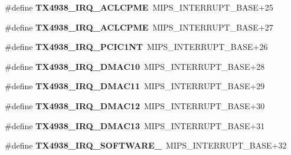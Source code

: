 \begin{DoxyCompactItemize}
\item 
\mbox{\label{group__bsp__interrupt_ga5f49d9074d04efb12e01379a526aa18e}} 
\#define {\bfseries T\+X4938\+\_\+\+I\+R\+Q\+\_\+\+A\+C\+L\+C\+P\+ME}~M\+I\+P\+S\+\_\+\+I\+N\+T\+E\+R\+R\+U\+P\+T\+\_\+\+B\+A\+SE+25
\item 
\mbox{\label{group__bsp__interrupt_ga5f49d9074d04efb12e01379a526aa18e}} 
\#define {\bfseries T\+X4938\+\_\+\+I\+R\+Q\+\_\+\+A\+C\+L\+C\+P\+ME}~M\+I\+P\+S\+\_\+\+I\+N\+T\+E\+R\+R\+U\+P\+T\+\_\+\+B\+A\+SE+27
\item 
\mbox{\label{group__bsp__interrupt_ga045463fc0b78bc9a1ca3cc99b56ddb73}} 
\#define {\bfseries T\+X4938\+\_\+\+I\+R\+Q\+\_\+\+P\+C\+I\+C1\+NT}~M\+I\+P\+S\+\_\+\+I\+N\+T\+E\+R\+R\+U\+P\+T\+\_\+\+B\+A\+SE+26
\item 
\mbox{\label{group__bsp__interrupt_ga300d7562514c562f3f8b05c0cb36df6c}} 
\#define {\bfseries T\+X4938\+\_\+\+I\+R\+Q\+\_\+\+D\+M\+A\+C10}~M\+I\+P\+S\+\_\+\+I\+N\+T\+E\+R\+R\+U\+P\+T\+\_\+\+B\+A\+SE+28
\item 
\mbox{\label{group__bsp__interrupt_ga4172049fa84eece69a4fce79b036217c}} 
\#define {\bfseries T\+X4938\+\_\+\+I\+R\+Q\+\_\+\+D\+M\+A\+C11}~M\+I\+P\+S\+\_\+\+I\+N\+T\+E\+R\+R\+U\+P\+T\+\_\+\+B\+A\+SE+29
\item 
\mbox{\label{group__bsp__interrupt_gaab6be2d80448c021a30bba0c5818f0ed}} 
\#define {\bfseries T\+X4938\+\_\+\+I\+R\+Q\+\_\+\+D\+M\+A\+C12}~M\+I\+P\+S\+\_\+\+I\+N\+T\+E\+R\+R\+U\+P\+T\+\_\+\+B\+A\+SE+30
\item 
\mbox{\label{group__bsp__interrupt_ga521c16cb64c176bdaabb58827536776c}} 
\#define {\bfseries T\+X4938\+\_\+\+I\+R\+Q\+\_\+\+D\+M\+A\+C13}~M\+I\+P\+S\+\_\+\+I\+N\+T\+E\+R\+R\+U\+P\+T\+\_\+\+B\+A\+SE+31
\item 
\mbox{\label{group__bsp__interrupt_ga9319745af3f5c166ffddcab7bc4f63fc}} 
\#define {\bfseries T\+X4938\+\_\+\+I\+R\+Q\+\_\+\+S\+O\+F\+T\+W\+A\+R\+E\+\_}~M\+I\+P\+S\+\_\+\+I\+N\+T\+E\+R\+R\+U\+P\+T\+\_\+\+B\+A\+SE+32
\item 

\end{DoxyCompactItemize}
